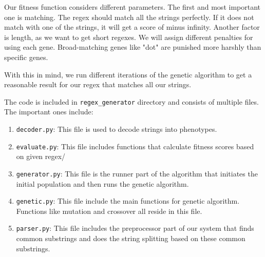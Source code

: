 \documentclass[12pt]{article}
\begin{document}
Our fitness function considers different parameters. The first and most important one is matching. The regex should match all the strings perfectly. If it does not match with one of the strings, it will get a score of minus infinity. Another factor is length, as we want to get short regexes. We will assign different penalties for using each gene. Broad-matching genes like "dot" are punished more harshly than specific genes.

With this in mind, we run different iterations of the genetic algorithm to get a reasonable result for our regex that matches all our strings.

The code is included in \verb*|regex_generator| directory and consists of multiple files. The important ones include:

\begin{enumerate}
\item \verb*|decoder.py|: This file is used to decode strings into phenotypes.

\item \verb*|evaluate.py|: This file includes functions that calculate fitness scores based on given regex/

\item \verb*|generator.py|: This file is the runner part of the algorithm that initiates the initial population and then runs the genetic algorithm.

\item \verb*|genetic.py|: This file include the main functions for genetic algorithm. Functions like mutation and crossover all reside in this file.

\item \verb*|parser.py|: This file includes the preprocessor part of our system that finds common substrings and does the string splitting based on these common substrings.

\end{enumerate}





\newpage
\end{document}
